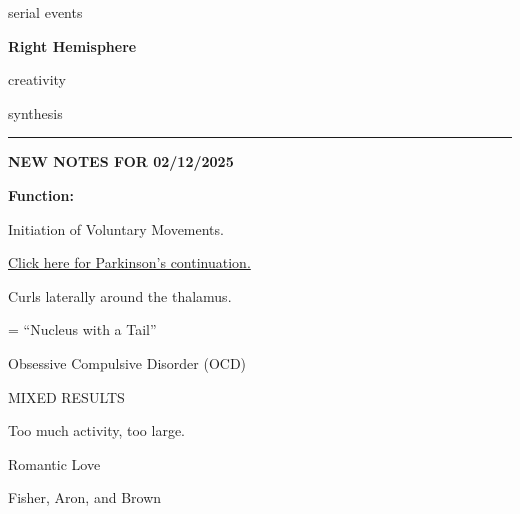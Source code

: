 \begin{coloredlist}
\begin{coloredlist}
\begin{coloredlist}
\begin{coloredlist}
                \item serial events
            \end{coloredlist}
            \item \textbf{Right Hemisphere}
            \begin{coloredlist}
                \item creativity
                \item synthesis
            \end{coloredlist}
        \end{coloredlist}
    \end{coloredlist}
    \begin{center}
        \hrule
        \textbf{NEW NOTES FOR 02/12/2025}
    \end{center}
    \item {}
    \begin{coloredlist}
        \item \textbf{Function:}
        \begin{coloredlist}
            \item Initiation of Voluntary Movements.
            \item \hyperlink{parkinson}{Click here for Parkinson's continuation.}
        \end{coloredlist}
    \end{coloredlist}
    \item Curls laterally around the thalamus.
    \item {}
    \begin{coloredlist}
        \item {} = ``Nucleus with a Tail''
        \begin{coloredlist}
            \item Obsessive Compulsive Disorder (OCD)
            \begin{coloredlist}
                \item MIXED RESULTS
                \begin{coloredlist}
                    \item Too much activity, too large.
                \end{coloredlist}
            \end{coloredlist}
            \item Romantic Love
            \begin{coloredlist}
                \item Fisher, Aron, and Brown

\end{coloredlist}
\end{coloredlist}
\end{coloredlist}
\end{coloredlist}
